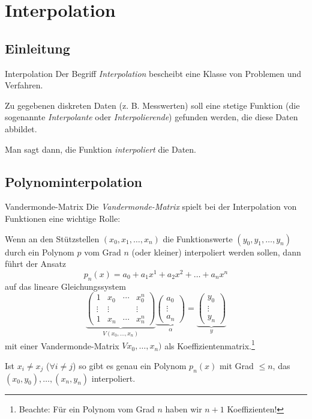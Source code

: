 \section{Interpolation}

\subsection{Einleitung}

\begin{defi}{Interpolation}
    Der Begriff \emph{Interpolation} bescheibt eine Klasse von Problemen und Verfahren. 
    
    Zu gegebenen diskreten Daten (z. B. Messwerten) soll eine stetige Funktion (die sogenannte \emph{Interpolante} oder \emph{Interpolierende}) gefunden werden, die diese Daten abbildet. 
    
    Man sagt dann, die Funktion \emph{interpoliert} die Daten. 
\end{defi}

\subsection{Polynominterpolation}

\begin{defi}{Vandermonde-Matrix}
    Die \emph{Vandermonde-Matrix} spielt bei der Interpolation von Funktionen eine wichtige Rolle: 
    
    Wenn an den Stützstellen $(x_0, x_1, \ldots, x_n)$ die Funktionswerte $(y_0, y_1, \ldots, y_n)$ durch ein Polynom $p$ vom Grad $n$ (oder kleiner) interpoliert werden sollen, dann führt der Ansatz 
    \[
        p_n(x) = a_0 + a_1 x^1 + a_2 x^2 + \ldots + a_{n} x^{n}
    \]
    auf das lineare Gleichungssystem 
    \[
        \underbrace{\begin{pmatrix}
                1      & x_0    & \cdots & x_0^n  \\ 
                \vdots & \vdots &        & \vdots \\ 
                1      & x_n    & \cdots & x_n^n 
            \end{pmatrix}}_{V(x_0, \ldots, x_n)}
        \underbrace{\begin{pmatrix}
                a_0 \\ \vdots \\ a_n
            \end{pmatrix}}_{\alpha}
        =
        \underbrace{\begin{pmatrix}
                y_0 \\ \vdots \\ y_n     
            \end{pmatrix}}_{y}
    \]
    mit einer Vandermonde-Matrix $Vx_0, \ldots, x_n)$ als Koeffizientenmatrix.\footnote{Beachte: Für ein Polynom vom Grad $n$ haben wir $n+1$ Koeffizienten!}
    
    Ist $x_i \neq x_j$ ($\forall i \neq j$) so gibt es genau ein Polynom $p_n(x)$ mit Grad $\leq n$, das $(x_0, y_0), \ldots, (x_n, y_n)$ interpoliert. 
\end{defi}

